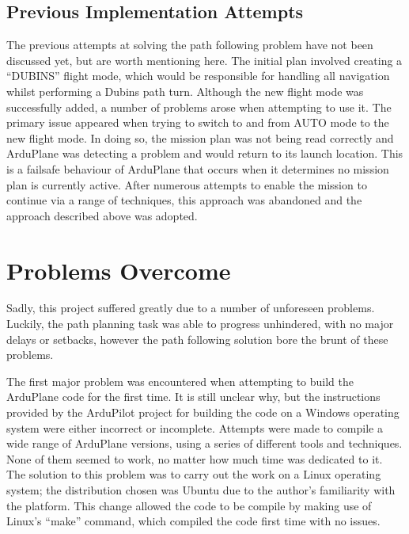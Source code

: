 \subsection{Previous Implementation Attempts}
\label{planning:agile:previous}

The previous attempts at solving the path following problem have not been discussed yet, but are worth mentioning here. The initial plan involved creating a ``DUBINS'' flight mode, which would be responsible for handling all navigation whilst performing a Dubins path turn. Although the new flight mode was successfully added, a number of problems arose when attempting to use it. The primary issue appeared when trying to switch to and from AUTO mode to the new flight mode. In doing so, the mission plan was not being read correctly and ArduPlane was detecting a problem and would return to its launch location. This is a failsafe behaviour of ArduPlane that occurs when it determines no mission plan is currently active. After numerous attempts to enable the mission to continue via a range of techniques, this approach was abandoned and the approach described above was adopted.

\section{Problems Overcome}
\label{planning:problems}

Sadly, this project suffered greatly due to a number of unforeseen problems. Luckily, the path planning task was able to progress unhindered, with no major delays or setbacks, however the path following solution bore the brunt of these problems. 

The first major problem was encountered when attempting to build the ArduPlane code for the first time. It is still unclear why, but the instructions provided by the ArduPilot project for building the code on a Windows operating system were either incorrect or incomplete. Attempts were made to compile a wide range of ArduPlane versions, using a series of different tools and techniques. None of them seemed to work, no matter how much time was dedicated to it. The solution to this problem was to carry out the work on a Linux operating system; the distribution chosen was Ubuntu due to the author's familiarity with the platform. This change allowed the code to be compile by making use of Linux's ``make'' command, which compiled the code first time with no issues. 

